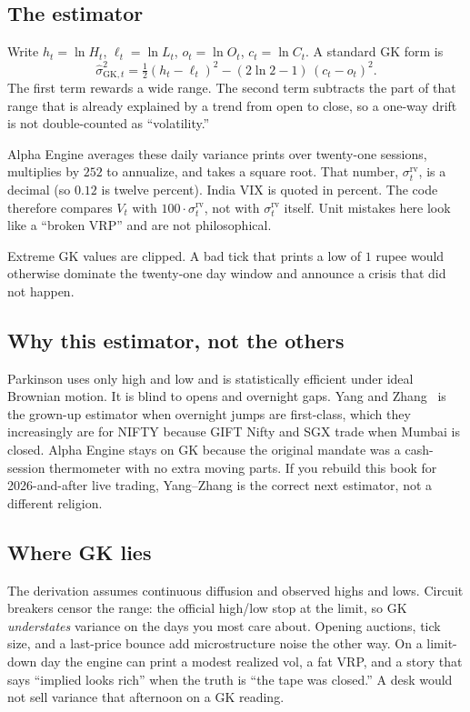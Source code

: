 \documentclass[11pt,a4paper]{article}
\begin{document}
\subsection{The estimator}

Write $h_t=\ln H_t$, $\ell_t=\ln L_t$, $o_t=\ln O_t$, $c_t=\ln C_t$. A standard GK form is
\begin{equation}
  \widehat{\sigma}^{2}_{\mathrm{GK},t}
  = \tfrac12 (h_t-\ell_t)^2
  -(2\ln 2-1)\,(c_t-o_t)^2.
\end{equation}
The first term rewards a wide range. The second term subtracts the part of that range that is already explained by a trend from open to close, so a one-way drift is not double-counted as ``volatility.''

Alpha Engine averages these daily variance prints over twenty-one sessions, multiplies by $252$ to annualize, and takes a square root. That number, $\sigma^{\mathrm{rv}}_t$, is a decimal (so $0.12$ is twelve percent). India VIX is quoted in percent. The code therefore compares $V_t$ with $100\cdot\sigma^{\mathrm{rv}}_t$, not with $\sigma^{\mathrm{rv}}_t$ itself. Unit mistakes here look like a ``broken VRP'' and are not philosophical.

Extreme GK values are clipped. A bad tick that prints a low of $1$ rupee would otherwise dominate the twenty-one day window and announce a crisis that did not happen.

\subsection{Why this estimator, not the others}

Parkinson uses only high and low and is statistically efficient under ideal Brownian motion. It is blind to opens and overnight gaps. Yang and Zhang~\cite{yangzhang2000} is the grown-up estimator when overnight jumps are first-class, which they increasingly are for NIFTY because GIFT Nifty and SGX trade when Mumbai is closed. Alpha Engine stays on GK because the original mandate was a cash-session thermometer with no extra moving parts. If you rebuild this book for 2026-and-after live trading, Yang--Zhang is the correct next estimator, not a different religion.

\subsection{Where GK lies}

The derivation assumes continuous diffusion and observed highs and lows. Circuit breakers censor the range: the official high/low stop at the limit, so GK \emph{understates} variance on the days you most care about. Opening auctions, tick size, and a last-price bounce add microstructure noise the other way. On a limit-down day the engine can print a modest realized vol, a fat VRP, and a story that says ``implied looks rich'' when the truth is ``the tape was closed.'' A desk would not sell variance that afternoon on a GK reading.
\end{document}
